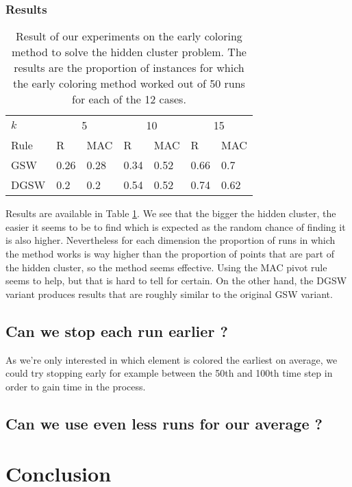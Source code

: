 \documentclass[12pt]{article}
\begin{document}
\subsubsection{Results}
\begin{center}
\begin{table}[h]
\begin{tabular}{l|ll|ll|ll}
$k$  & \multicolumn{2}{c}{5} & \multicolumn{2}{c}{10} & \multicolumn{2}{c}{15}\\
Rule &R&MAC&R&MAC&R&MAC\\ \hline
GSW  &0.26&0.28&0.34&0.52&0.66&0.7\\
DGSW &0.2&0.2&0.54&0.52&0.74&0.62\\
\end{tabular}
\caption{Result of our experiments on the early coloring method to solve the hidden cluster problem. The results are the proportion of instances for which the early coloring method worked out of 50 runs for each of the 12 cases.}
\label{early_coloring_method_exp1}
\end{table}
\end{center}
Results are available in Table \ref{early_coloring_method_exp1}. We see that the bigger the hidden cluster, the easier it seems to be to find which is expected as the random chance of finding it is also higher. Nevertheless for each dimension the proportion of runs in which the method works is way higher than the proportion of points that are part of the hidden cluster, so the method seems effective. Using the MAC pivot rule seems to help, but that is hard to tell for certain. On the other hand, the DGSW variant produces results that are roughly similar to the original GSW variant.

\subsection{Can we stop each run earlier ?}
As we're only interested in which element is colored the earliest on average, we could try stopping early for example between the 50th and 100th time step in order to gain time in the process.

\subsection{Can we use even less runs for our average ?}

\section{Conclusion}
\newpage


\newpage
\nocite{*}



\end{document}
